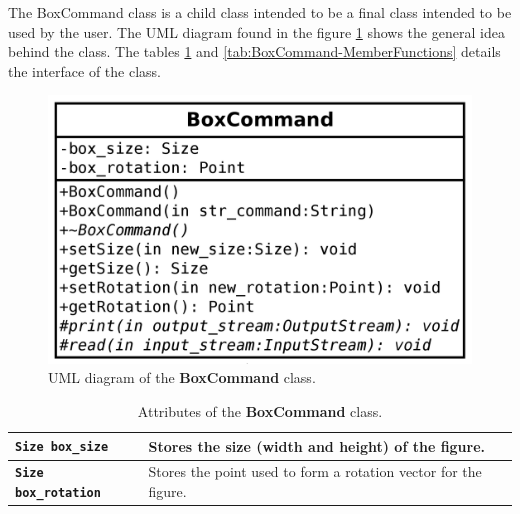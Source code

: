 \documentclass[11pt,twoside,openany,x11names,svgnames]{memoir}
\begin{document}
The BoxCommand class is a child class intended to be a final class intended to be used by the user. The UML diagram found in the figure \ref{fig:class-box-command} shows the general idea behind the class. The tables \ref{tab:BoxCommand-Attributes} and \ref{tab:BoxCommand-MemberFunctions} details the interface of the class.

\begin{figure}
	\centering
	\includegraphics[scale=0.2, clip=true, trim= 0pt 0pt 0pt 0pt]{images/chapter03-image22}
	\caption{UML diagram of the \textbf{BoxCommand} class.}
	\label{fig:class-box-command}
\end{figure}

\begin{table}[h]\footnotesize
\centering
\begin{tabular}{| >{\bfseries}p{6.5cm} | p{9cm} |}
	\hline
	
	\texttt{Size box\_size} & Stores the size (width and height) of the figure. \\
	
	\hline
	
	\texttt{Size box\_rotation} & Stores the point used to form a rotation vector for the figure. \\

	\hline
\end{tabular}
\caption{Attributes of the \textbf{BoxCommand} class.}
\label{tab:BoxCommand-Attributes}
\end{table}
\end{document}
